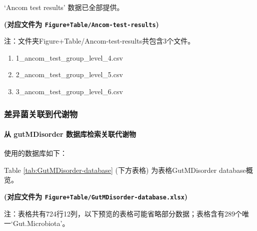 \documentclass[
]{article}
\providecommand{\tightlist}{%
  \setlength{\itemsep}{0pt}\setlength{\parskip}{0pt}}
\begin{document}
`Ancom test results' 数据已全部提供。

\textbf{(对应文件为 \texttt{Figure+Table/Ancom-test-results})}

\begin{center}\begin{tcolorbox}[colback=gray!10, colframe=gray!50, width=0.9\linewidth, arc=1mm, boxrule=0.5pt]注：文件夹Figure+Table/Ancom-test-results共包含3个文件。

\begin{enumerate}\tightlist
\item 1\_ancom\_test\_group\_level\_4.csv
\item 2\_ancom\_test\_group\_level\_5.csv
\item 3\_ancom\_test\_group\_level\_6.csv
\end{enumerate}\end{tcolorbox}
\end{center}

\hypertarget{ux5deeux5f02ux83ccux5173ux8054ux5230ux4ee3ux8c22ux7269}{%
\subsubsection{差异菌关联到代谢物}\label{ux5deeux5f02ux83ccux5173ux8054ux5230ux4ee3ux8c22ux7269}}

\hypertarget{ux4ece-gutmdisorder-ux6570ux636eux5e93ux68c0ux7d22ux5173ux8054ux4ee3ux8c22ux7269}{%
\paragraph{从 gutMDisorder 数据库检索关联代谢物}\label{ux4ece-gutmdisorder-ux6570ux636eux5e93ux68c0ux7d22ux5173ux8054ux4ee3ux8c22ux7269}}

使用的数据库如下：

Table \ref{tab:GutMDisorder-database} (下方表格) 为表格GutMDisorder database概览。

\textbf{(对应文件为 \texttt{Figure+Table/GutMDisorder-database.xlsx})}

\begin{center}\begin{tcolorbox}[colback=gray!10, colframe=gray!50, width=0.9\linewidth, arc=1mm, boxrule=0.5pt]注：表格共有724行12列，以下预览的表格可能省略部分数据；表格含有289个唯一`Gut.Microbiota'。
\end{tcolorbox}
\end{center}
\end{document}
